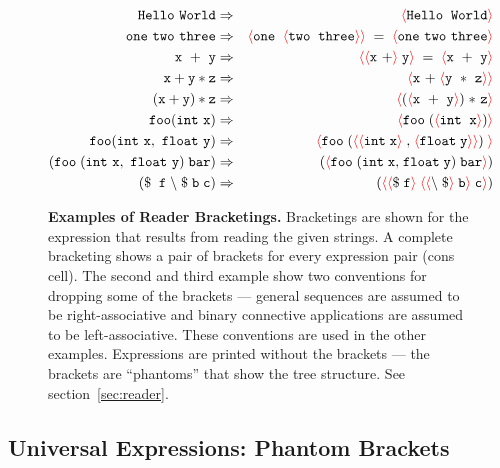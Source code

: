 \documentclass{article}
\newcommand{\fopen}{{\color{red} \langle}}
\newcommand{\fclose}{{\color{red} \rangle}}
\begin{document}
\begin{figure}
\begin{eqnarray*}
  \mathtt{Hello~World} & \Rightarrow & \fopen \mathtt{Hello}\;\; \mathtt{World}\fclose \\
  \mathtt{one~two~three} & \Rightarrow & \fopen \mathtt{one}\;\; \fopen \mathtt{two} \; \;\mathtt{three}\fclose\fclose\;   = \; \fopen \mathtt{one~two~three} \fclose \\
  \mathtt{x~+~y} & \Rightarrow & \fopen\fopen \mathtt{x~+}\fclose\;\mathtt{y}\fclose \; = \; \fopen \mathtt{x~+~y} \fclose \\
  \mathtt{x+y*z} & \Rightarrow & \fopen \mathtt{x~+}\; \fopen \mathtt{y~*~z} \fclose\fclose \\
  \mathtt{(x+y)*z} & \Rightarrow & \fopen (\fopen \mathtt{x~+~y} \fclose )\;\mathtt{*~z}\fclose \\
  \mathtt{foo}(\mathtt{int~x}) & \Rightarrow & \fopen \mathtt{foo}\; (\fopen \mathtt{int}\;  \; \mathtt{x}\fclose)\fclose \\
  \mathtt{foo(int~x,~float~y)} & \Rightarrow & \fopen \mathtt{foo} \; (\fopen\fopen \mathtt{int}\; \mathtt{x} \fclose\;
  \mathtt{,}\; \fopen\mathtt{float} \; \mathtt{y} \fclose\fclose )\;\fclose \\
  \mathtt{(foo\; (int~x,~float~y)\; bar)} & \Rightarrow & (\fopen \mathtt{foo} \; (\mathtt{int}\; \mathtt{x}
  \mathtt{,}\; \mathtt{float} \; \mathtt{y})\;{\tt bar}\fclose) \\
  \mathtt{(\$\; \;f\; \backslash \;\$\;b\;c)} & \Rightarrow & (\fopen\fopen\$\; \mathtt{f}\fclose\; \fopen\fopen\backslash \;\$\fclose \;\mathtt{b}\fclose\;{\tt c}\fclose)
\end{eqnarray*}

\caption{{\bf Examples of Reader Bracketings.} Bracketings are shown for the expression that results from reading the given strings.
  A complete bracketing shows a pair of brackets for every expression
  pair (cons cell).  The second and third example show two conventions
  for dropping some of the brackets --- general sequences are assumed
  to be right-associative and binary connective applications are
  assumed to be left-associative.  These conventions are used in the
  other examples.  Expressions are printed without the brackets ---
  the brackets are ``phantoms'' that show the tree structure.
  See section~\ref{sec:reader}.}
\label{fig:reader}
\end{figure}

\subsection{Universal Expressions: Phantom Brackets}
\end{document}
